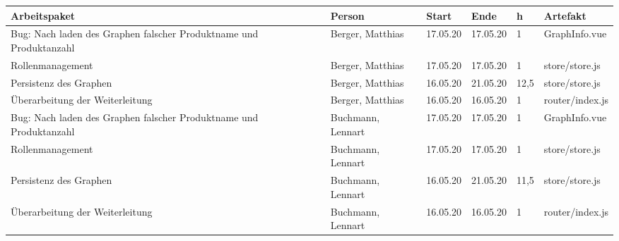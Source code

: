 \begin{longtable}{|p{4cm}|p{2cm}|p{1.2cm}|p{1.2cm}|p{0.7cm}|p{3.8cm}|}
  \hline
  Arbeitspaket                                                          & Person                & Start    & Ende     & h     & Artefakt                                                    \\
  \hline
  Bug: Nach laden des Graphen falscher Produktname und Produktanzahl    & Berger, Matthias      & 17.05.20 & 17.05.20 & 1     & GraphInfo.vue                                               \\ \hline
  Rollenmanagement                                                      & Berger, Matthias      & 17.05.20 & 17.05.20 & 1     & store/store.js                                              \\ \hline
  Persistenz des Graphen                                                & Berger, Matthias      & 16.05.20 & 21.05.20 & 12,5  & store/store.js                                              \\ \hline
  Überarbeitung der Weiterleitung                                       & Berger, Matthias      & 16.05.20 & 16.05.20 & 1     & router/index.js                                             \\ \hline

  Bug: Nach laden des Graphen falscher Produktname und Produktanzahl    & Buchmann, Lennart     & 17.05.20 & 17.05.20 & 1     & GraphInfo.vue                                               \\ \hline
  Rollenmanagement                                                      & Buchmann, Lennart     & 17.05.20 & 17.05.20 & 1     & store/store.js                                              \\ \hline
  Persistenz des Graphen                                                & Buchmann, Lennart     & 16.05.20 & 21.05.20 & 11,5  & store/store.js                                              \\ \hline
  Überarbeitung der Weiterleitung                                       & Buchmann, Lennart     & 16.05.20 & 16.05.20 & 1     & router/index.js                                             \\ \hline


\end{longtable}
